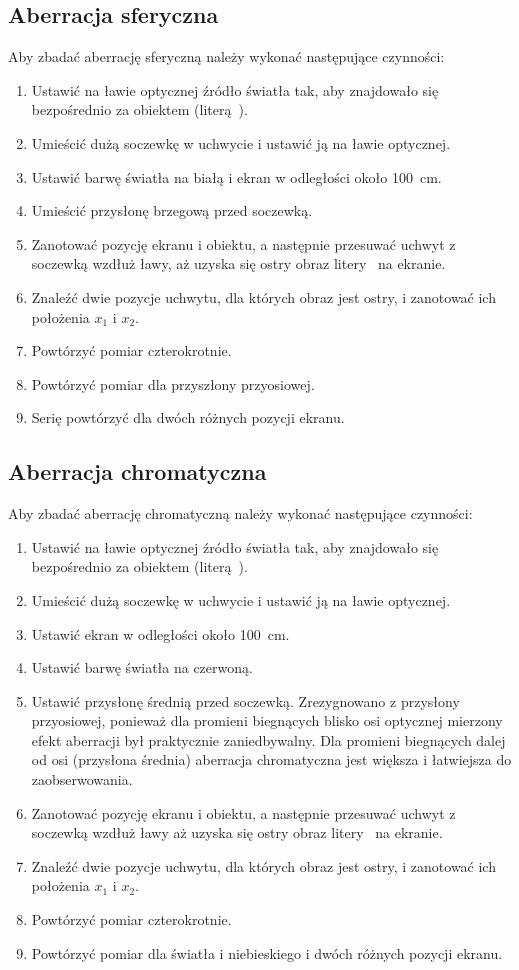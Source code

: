 \documentclass[12pt, a4paper]{article}
\begin{document}
\subsection{Aberracja sferyczna}
Aby zbadać aberrację sferyczną należy wykonać następujące czynności:
\begin{enumerate}
    \item Ustawić na ławie optycznej źródło światła tak, aby znajdowało się bezpośrednio za obiektem (literą~).
    \item Umieścić dużą soczewkę w uchwycie i ustawić ją na ławie optycznej.
    \item Ustawić barwę światła na białą i ekran w odległości około 100~cm.
    \item Umieścić przysłonę brzegową przed soczewką.
    \item Zanotować pozycję ekranu i obiektu, a następnie przesuwać uchwyt z soczewką wzdłuż ławy, aż uzyska się ostry obraz litery~ na ekranie.
    \item Znaleźć dwie pozycje uchwytu, dla których obraz jest ostry, i zanotować ich położenia $x_1$ i $x_2$.
    \item Powtórzyć pomiar czterokrotnie.
    \item Powtórzyć pomiar dla przyszłony przyosiowej.
    \item Serię powtórzyć dla dwóch różnych pozycji ekranu.
\end{enumerate}

\subsection{Aberracja chromatyczna}
Aby zbadać aberrację chromatyczną należy wykonać następujące czynności:
\begin{enumerate}
    \item Ustawić na ławie optycznej źródło światła tak, aby znajdowało się bezpośrednio za obiektem (literą~).
    \item Umieścić dużą soczewkę w uchwycie i ustawić ją na ławie optycznej.
    \item Ustawić ekran w odległości około 100~cm.
    \item Ustawić barwę światła na czerwoną.
    \item Ustawić przysłonę średnią przed soczewką. Zrezygnowano z przysłony przyosiowej, ponieważ dla promieni biegnących blisko osi optycznej mierzony efekt aberracji był praktycznie zaniedbywalny. Dla promieni biegnących dalej od osi (przysłona średnia) aberracja chromatyczna jest większa i łatwiejsza do zaobserwowania.
    \item Zanotować pozycję ekranu i obiektu, a następnie przesuwać uchwyt z soczewką wzdłuż ławy aż uzyska się ostry obraz litery~ na ekranie.
    \item Znaleźć dwie pozycje uchwytu, dla których obraz jest ostry, i zanotować ich położenia $x_1$ i $x_2$.
    \item Powtórzyć pomiar czterokrotnie.
    \item Powtórzyć pomiar dla światła i niebieskiego i dwóch różnych pozycji ekranu.
\end{enumerate}
\end{document}
